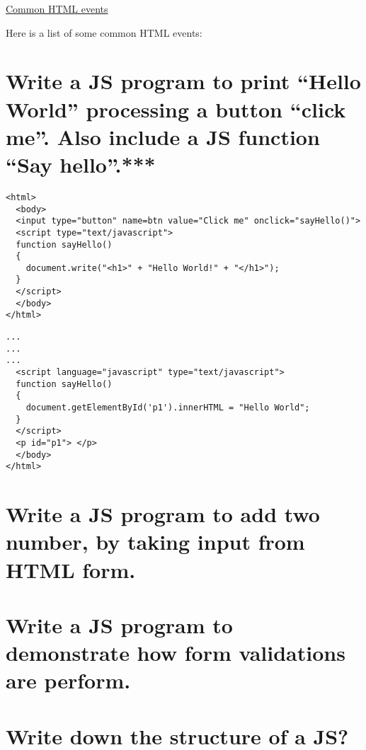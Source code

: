 \documentclass[14pt]{article}
\begin{document}
{\large \underline{Common HTML events}\normalsize

Here is a list of some common HTML events:
\ \\


\section{Write a JS program to print “Hello World” processing a button “click me”. Also include a JS function “Say hello”.***}
\begin{lstlisting}
<html>
  <body>
  <input type="button" name=btn value="Click me" onclick="sayHello()">
  <script type="text/javascript">
  function sayHello()
  {
    document.write("<h1>" + "Hello World!" + "</h1>");
  }
  </script>
  </body>
</html>
\end{lstlisting}
\begin{lstlisting}
...
...
...
  <script language="javascript" type="text/javascript">
  function sayHello()
  {
    document.getElementById('p1').innerHTML = "Hello World";
  }
  </script>
  <p id="p1"> </p>
  </body>
</html>
\end{lstlisting}
\section{Write a JS program to add two number, by taking input from HTML form.}
\section{Write a JS program to demonstrate how form validations are perform.}
\section{Write down the structure of a JS?}

}
\end{document}
